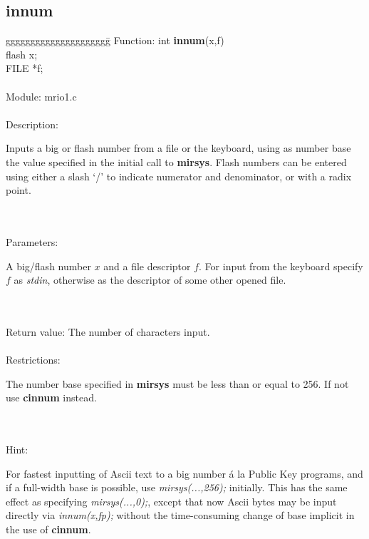 \subsection{innum}
\begin{tabbing}
ggggggggggggggggggggg\= \kill
      Function:      \>int {\bf innum}(x,f) \\
                     \>flash x; \\
                     \>FILE *f; \\
      \ \\
      Module:        \>mrio1.c \\
      \ \\
      Description:   \>
                     \parbox[t]{3in}
                     {Inputs a big or flash number from a file or the keyboard,
                     using as number base the value specified in the initial
                     call to {\bf mirsys}.
                     Flash numbers can be entered using either
                     a slash `/' to indicate numerator and denominator, or
                     with a radix point.} \\ 
      \ \\
      Parameters:    \>
                     \parbox[t]{3in}
                     {A big/flash number $x$ and a file descriptor $f$. For input
                     from the keyboard specify $f$ as {\em stdin}, otherwise as the
                     descriptor of some other opened file.} \\
      \ \\
      Return value:  \>The number of characters input. \\
      \ \\
      Restrictions:  \>
                     \parbox[t]{3in}
                     {The number base specified in {\bf mirsys} must be less
                     than or equal to 256. If not use {\bf cinnum} instead.} \\
       \ \\
       Hint:         \>
                     \parbox[t]{3in}
                     {For fastest inputting of Ascii text to a big number \'a la
                      Public Key programs, and if a full-width base is 
                      possible, use {\em mirsys(...,256);} initially. This has 
                      the same effect as specifying {\em mirsys(...,0);},
                      except that now Ascii bytes may be input directly via 
                      {\em innum(x,fp);}
                      without the time-consuming change of base implicit in
                      the use of {\bf cinnum}.} \\


\end{tabbing}

